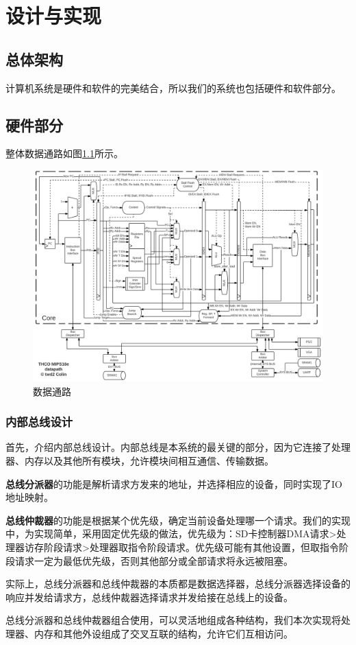 \documentclass[11pt,utf8]{report}
\begin{document}
\chapter{设计与实现}

\section{总体架构}
	\par 计算机系统是硬件和软件的完美结合，所以我们的系统也包括硬件和软件部分。

\section{硬件部分}

	整体数据通路如图\ref{datapath}所示。

	\begin{figure}[H]
		\centering
		\setlength{\leftskip}{-40pt}
		\includegraphics[width=1.2\textwidth]{datapath}
		\caption{数据通路}
		\label{datapath}
	\end{figure}

\subsection{内部总线设计}
	\par 首先，介绍内部总线设计。内部总线是本系统的最关键的部分，因为它连接了处理器、内存以及其他所有模块，允许模块间相互通信、传输数据。
	\par \textbf{总线分派器}的功能是解析请求方发来的地址，并选择相应的设备，同时实现了IO地址映射。
	\par \textbf{总线仲裁器}的功能是根据某个优先级，确定当前设备处理哪一个请求。我们的实现中，为实现简单，采用固定优先级的做法，优先级为：SD卡控制器DMA请求>处理器访存阶段请求>处理器取指令阶段请求。优先级可能有其他设置，但取指令阶段请求一定为最低优先级，否则其他部分或全部请求将永远被阻塞。
	\par 实际上，总线分派器和总线仲裁器的本质都是数据选择器，总线分派器选择设备的响应并发给请求方，总线仲裁器选择请求并发给接在总线上的设备。
	\par 总线分派器和总线仲裁器组合使用，可以灵活地组成各种结构，我们本次实现将处理器、内存和其他外设组成了交叉互联的结构，允许它们互相访问。
\end{document}
